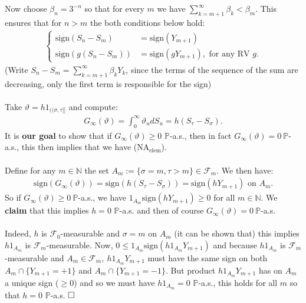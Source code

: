 \documentclass[12pt,a4paper, twoside]{article}
\theoremstyle{definition}
\newcommand{\PP}{\mathbb{P}} %
\newcommand{\sign}{\text{sign}}
\begin{document}
Now choose $\beta_n = 3^{-n}$ so that for every $m$ we have $\sum_{k=m+1}^\infty \beta_k < \beta_m$. This ensures that for $n >m$ the both conditions below hold:
\begin{align*}
\begin{cases} \sign(S_n-S_m)&= \sign(Y_{m+1}) \\
\sign(g(S_n-S_m))&= \sign(gY_{m+1}), \text{ for any RV } g. 
\end{cases}
\end{align*}
(Write $S_n-S_m = \sum_{k=m+1}^\infty \beta_k Y_k$, since the terms of the sequence of the sum are decreasing, only the first term is responsible for the sign)\\
\\
Take $\vartheta = h 1_{(\!( \sigma, \tau ]\!]}$ and compute: 
\begin{align*}
G_\infty ( \vartheta) = \int_0^\infty \vartheta_u d S_u = h ( S_\tau-S_\sigma).  
\end{align*}
It is \textbf{our goal} to show that if $G_\infty( \vartheta) \geq 0$ $\PP$-a.s., then in fact $G_\infty( \vartheta)=0 \ \PP$-a.s., this then implies that we have (NA$_\text{elem}$). \\
\\
Define for any $m \in \mathbb{N}$ the set $A_m:= \{ \sigma = m, \tau > m \} \in \mathcal{F}_m$. We then have: 
\begin{align*}
\sign(G_\infty( \vartheta))= \sign(h(S_\tau-S_\sigma)) = \sign(hY_{m+1}) \text{ on } A_m. 
\end{align*}
So if $G_\infty ( \vartheta) \geq 0 \ \PP$-a.s., we have $1_{A_m} \sign(hY_{m+1}) \geq 0$ for all $m \in \mathbb{N}$. We \textbf{claim} that this implies $h=0$ $\PP$-a.s. and then of course $G_\infty ( \vartheta)=0 \ \PP$-a.s. \\
\\
Indeed, $h$ is $\mathcal{F}_0$-measurable and $\sigma=m$ on $A_m$ (it can be shown that) this implies $h1_{A_m}$ is $\mathcal{F}_m$-measurable. Now, $0 \leq 1_{A_m} \sign(h1_{A_m}Y_{m+1})$ and because $h1_{A_m}$ is $\mathcal{F}_m$-measurable and $A_m \in \mathcal{F}_m, \ h 1_{A_m} Y_{m+1}$ must have the same sign on both $A_m \cap \{Y_{m+1}=+1\}$ and $A_m \cap \{Y_{m+1}=-1\}.$ But product $h1_{A_m} Y_{m+1}$ has on $A_m$ a unique sign ($ \geq 0$) and so we must have $h1_{A_m}=0$ $\PP$-a.s., this holds for all $m$ so that $h=0$ $\PP$-a.s. $\hfill \Box$
\newpage
\end{document}
